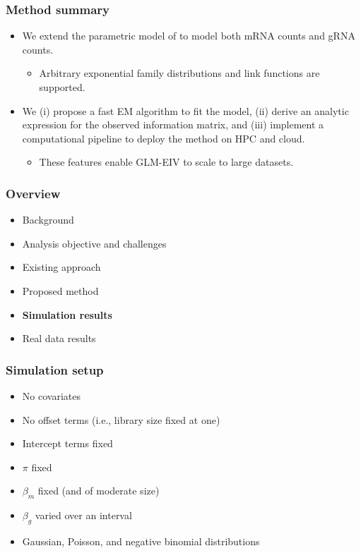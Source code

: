 \documentclass{beamer}
\begin{document}
\begin{frame}
\frametitle{Method summary}
\begin{itemize}
\item We extend the parametric model of \cite{Sarkar2021} to model both mRNA counts and gRNA counts.
\begin{itemize}
\item Arbitrary exponential family distributions and link functions are supported. 
\end{itemize}
\item We (i) propose a fast EM algorithm to fit the model, (ii) derive an analytic expression for the observed information matrix, and (iii) implement a computational pipeline to deploy the method on HPC and cloud. 
\begin{itemize}
\item These features enable GLM-EIV to scale to large datasets.
\end{itemize}
\end{itemize}
\end{frame}

\begin{frame}
\frametitle{Overview}
\begin{itemize}
	\item Background
	\item Analysis objective and challenges
	\item Existing approach
	\item Proposed method
	\item \textbf{Simulation results}
	\item Real data results
\end{itemize}
\end{frame}

\begin{frame}
\frametitle{Simulation setup}
\begin{itemize}
\item No covariates
\item No offset terms (i.e., library size fixed at one)
\item Intercept terms fixed
\item $\pi$ fixed
\item $\beta_m$ fixed (and of moderate size)
\item $\beta_g$ varied over an interval
\item Gaussian, Poisson, and negative binomial distributions
\end{itemize}
\end{frame}
\end{document}
